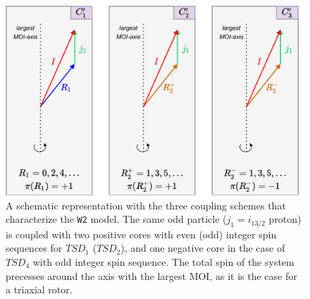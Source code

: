 \documentclass[myclassdoc,debug]{rjparticle}
\begin{document}
\begin{figure}
    \centering
    \includegraphics[scale=0.55]{figs/coupling_schemes_C1C2C3.pdf}
    \caption{A schematic representation with the three coupling schemes that characterize the \texttt{W2} model. The same odd particle ($j_1=i_{13/2}$ proton) is coupled with two positive cores with even (odd) integer spin sequences for $TSD_1$ ($TSD_2$), and one negative core in the case of $TSD_4$ with odd integer spin sequence. The total spin of the system precesses around the axis with the largest MOI, as it is the case for a triaxial rotor.}
    \label{three-couplings}
\end{figure}
\end{document}
